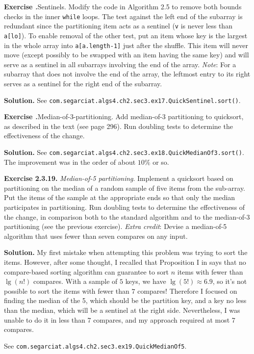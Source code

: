 \documentclass[12pt, a4paper]{article}
\newenvironment{ex}[2][Exercise]
{\par\medskip\noindent \textbf{#1 #2.}}
{\medskip}
\newenvironment{sol}[1][Solution]
{\par\medskip\noindent \textbf{#1.} }
{\medskip}
\begin{document}
	\begin{ex}{17}
		\emph{Sentinels}. Modify the code in Algorithm 2.5 to remove both bounds checks in the
		inner \texttt{while} loops. The test against the left end of the subarray is redundant
		since the partitioning item acts as a sentinel (\texttt{v} is never less than
		\texttt{a[lo]}). To enable removal of the other test, put an item whose key is the
		largest in the whole array into \texttt{a[a.length-1]} just after the shuffle. This
		item will  never move (except possibly to be swapped with an item having the same key)
		and will serve as a sentinel in all subarrays involving the end of the array.
		\emph{Note}: For a subarray that does not involve the end of the array, the leftmost
		entry to its right serves as a sentinel for the right end of the subarray.
	\end{ex}
	\begin{sol}
		See \texttt{com.segarciat.algs4.ch2.sec3.ex17.QuickSentinel.sort()}.
	\end{sol}
	\begin{ex}{18}
		\emph{Median-of-3-partitioning}. Add median-of-3 partitioning to quicksort, as described
		in the text (see page 296). Run doubling tests to determine the effectiveness of
		the change.
	\end{ex}
	\begin{sol}
		See \texttt{com.segarciat.algs4.ch2.sec3.ex18.QuickMedianOf3.sort()}.
		The improvement was in the order of about $10\%$ or so.
	\end{sol}
	\begin{ex}{2.3.19}
		\emph{Median-of-5 partitioning}. Implement a quicksort based on partitioning on
		the median of a random sample of five items from the sub-array. Put the items
		of the sample at the appropriate ends so that only the median participates in
		partitioning. Run doubling tests to determine the effectiveness of the change,
		in comparison both to the standard algorithm and to the median-of-3 partitioning
		(see the previous exercise). \emph{Extra credit}: Devise a median-of-5 algorithm
		that uses fewer than seven compares on any input.
	\end{ex}
	\begin{sol}
		My first mistake when attempting this problem was trying to sort the items.
		However, after some thought, I recalled that Proposition I in \cite{sedgewick_wayne}
		says that no compare-based sorting algorithm can guarantee to sort $n$ items
		with fewer than $\lg(n!)$ compares. With a sample of $5$ keys, we have
		$\lg(5!)\approx 6.9$, so it's not possible to sort the items with fewer
		than $7$ compares! Therefore I focused on finding the median of the 5, which should
		be the partition key, and a key no less than the median, which will be a sentinel
		at the right side. Nevertheless, I was unable to do it in less than 7 compares,
		and my approach required at most 7 compares.
		
		See \texttt{com.segarciat.algs4.ch2.sec3.ex19.QuickMedianOf5}.
		
	\end{sol}
	\pagebreak
	\printbibliography
\end{document}
